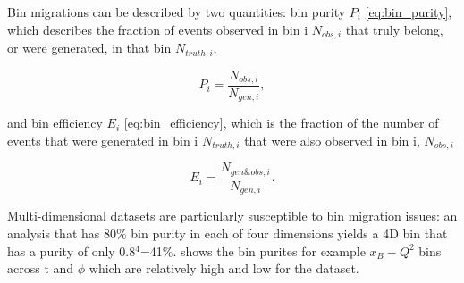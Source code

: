 Bin migrations can be described by two quantities: bin purity $P_{i}$ \eqref{eq:bin_purity}, which describes the fraction of events observed in bin i $N_{obs,i}$ that truly belong, or were generated, in that bin $N_{truth,i}$, 

    \begin{equation}
    P_{i} = \frac{N_{obs,i}}{N_{gen,i}},
    \end{equation}\label{eq:bin_purity}

    and bin efficiency  $E_{i}$ \eqref{eq:bin_efficiency}, which is the fraction of the number of events that were generated in bin i $N_{truth,i}$ that were also observed in bin i, $N_{obs,i}$ 

    \begin{equation}\label{eq:bin_efficiency}
    E_{i} = \frac{N_{gen\&obs,i}}{N_{gen,i}}.
    \end{equation}

Multi-dimensional datasets are particularly susceptible to bin migration issues: an analysis that has 80\% bin purity in each of four dimensions yields a 4D bin that has a purity of only 0.8$^4$=41\%.  shows the bin purites for example $x_B-Q^2$ bins across t and $\phi$ which are relatively high and low for the dataset. 
    

